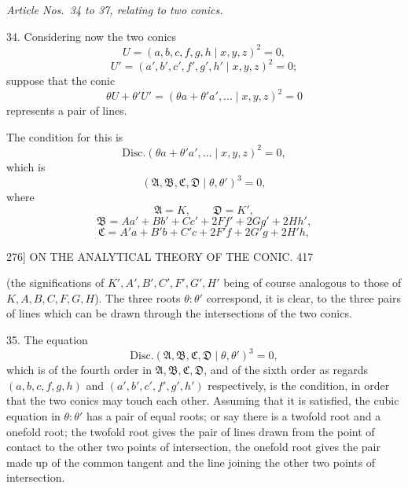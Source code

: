\documentclass[11pt]{article}
\providecommand{\Disc}{\mathrm{Disc}}
\begin{document}
\medskip
\centerline{\textit{Article Nos.~34 to 37, relating to two conics.}}
\medskip

\textsc{34.} Considering now the two conics
\[ U=(a,b,c,f,g,h \mid x,y,z)^{2}=0, \]
\[ U'=(a',b',c',f',g',h' \mid x,y,z)^{2}=0; \]
suppose that the conic
\[ \theta U+\theta' U'=(\theta a+\theta' a',\dots \mid x,y,z)^{2}=0 \]
represents a pair of lines.

The condition for this is
\[ \Disc.(\theta a+\theta' a',\dots \mid x,y,z)^{2}=0, \]
which is
\[ (\mathfrak{A},\mathfrak{B},\mathfrak{C},\mathfrak{D} \mid \theta,\theta')^{3}=0, \]
where
\[ \mathfrak{A}=K,\qquad \mathfrak{D}=K', \]
\[ \mathfrak{B}=Aa'+Bb'+Cc'+2Ff'+2Gg'+2Hh', \]
\[ \mathfrak{C}=A'a+B'b+C'c+2F'f+2G'g+2H'h, \]

\begin{center}
\textsc{276]} \hfill ON THE ANALYTICAL THEORY OF THE CONIC. \hfill 417
\end{center}

(the significations of $K',A',B',C',F',G',H'$ being of course analogous to those of
$K,A,B,C,F,G,H$). The three roots $\theta:\theta'$ correspond, it is clear, to the three
pairs of lines which can be drawn through the intersections of the two conics.

\textsc{35.} The equation
\[ \Disc.(\mathfrak{A},\mathfrak{B},\mathfrak{C},\mathfrak{D} \mid \theta,\theta')^{3}=0, \]
which is of the fourth order in $\mathfrak{A},\mathfrak{B},\mathfrak{C},\mathfrak{D}$, and of the sixth order as regards
$(a,b,c,f,g,h)$ and $(a',b',c',f',g',h')$ respectively, is the condition, in order that the
two conics may touch each other. Assuming that it is satisfied, the cubic equation
in $\theta:\theta'$ has a pair of equal roots; or say there is a twofold root and a onefold
root; the twofold root gives the pair of lines drawn from the point of contact to
the other two points of intersection, the onefold root gives the pair made up of the
common tangent and the line joining the other two points of intersection.
\end{document}
